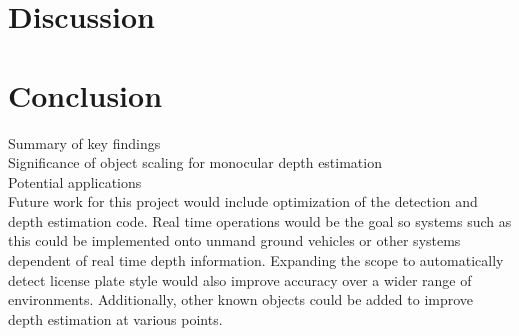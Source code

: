 \documentclass[12pt]{article}
\begin{document}
\section{Discussion}


\section{Conclusion}
Summary of key findings \\
Significance of object scaling for monocular depth estimation \\
Potential applications \\
Future work for this project would include optimization of the detection and depth estimation code. Real time operations would be the goal so systems such as this could be implemented onto unmand ground vehicles or other systems dependent of real time depth information. Expanding the scope to automatically detect license plate style would also improve accuracy over a wider range of environments. Additionally, other known objects could be added to improve depth estimation at various points.


\end{document}
